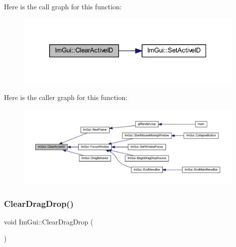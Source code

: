 Here is the call graph for this function\+:
\nopagebreak
\begin{figure}[H]
\begin{center}
\leavevmode
\includegraphics[width=320pt]{namespace_im_gui_a17ff60ad1e2669130ac38a04d16eb354_cgraph}
\end{center}
\end{figure}
Here is the caller graph for this function\+:
\nopagebreak
\begin{figure}[H]
\begin{center}
\leavevmode
\includegraphics[width=350pt]{namespace_im_gui_a17ff60ad1e2669130ac38a04d16eb354_icgraph}
\end{center}
\end{figure}
\mbox{\label{namespace_im_gui_adae8f94649956a2a717c00dbf81a5df9}} 
\subsubsection{\texorpdfstring{Clear\+Drag\+Drop()}{ClearDragDrop()}}
{\footnotesize\ttfamily void Im\+Gui\+::\+Clear\+Drag\+Drop (\begin{DoxyParamCaption}{ }\end{DoxyParamCaption})}

